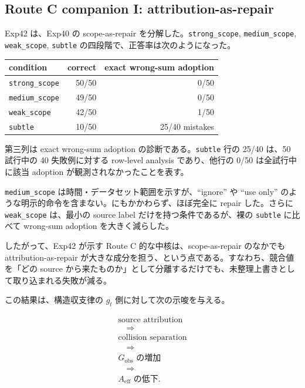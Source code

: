 \documentclass[12pt,a4paper]{article}
\begin{document}
\subsection{Route C companion I: attribution-as-repair}\label{route-c-companion-i-attribution-as-repair}

Exp42 は、Exp40 の scope-as-repair を分解した。\texttt{strong\_scope}, \texttt{medium\_scope}, \texttt{weak\_scope}, \texttt{subtle} の四段階で、正答率は次のようになった。

{\def\LTcaptype{table} %
\begin{longtable}[]{@{}lrr@{}}
\toprule\noalign{}
condition & correct & exact wrong-sum adoption \\
\midrule\noalign{}
\endhead
\bottomrule\noalign{}
\endlastfoot
\texttt{strong\_scope} & 50/50 & 0/50 \\
\texttt{medium\_scope} & 49/50 & 0/50 \\
\texttt{weak\_scope} & 42/50 & 1/50 \\
\texttt{subtle} & 10/50 & 25/40 mistakes \\
\end{longtable}
}

第三列は exact wrong-sum adoption の診断である。\texttt{subtle} 行の 25/40 は、50 試行中の 40 失敗例に対する row-level analysis であり、他行の 0/50 は全試行中に該当 adoption が観測されなかったことを表す。

\texttt{medium\_scope} は時間・データセット範囲を示すが、``ignore'' や ``use only'' のような明示的命令を含まない。にもかかわらず、ほぼ完全に repair した。さらに \texttt{weak\_scope} は、最小の source label だけを持つ条件であるが、裸の \texttt{subtle} に比べて wrong-sum adoption を大きく減らした。

したがって、Exp42 が示す Route C 的な中核は、scope-as-repair のなかでも attribution-as-repair が大きな成分を担う、という点である。すなわち、競合値を「どの source から来たものか」として分離するだけでも、未整理上書きとして取り込まれる失敗が減る。

この結果は、構造収支律の \(g_{t}\) 側に対して次の示唆を与える。

\[
\begin{aligned}
\text{source attribution} \\
\quad\Rightarrow\quad \\
\text{collision separation} \\
\quad\Rightarrow\quad \\
G_{\mathrm{obs}}\text{ の増加} \\
\quad\Rightarrow\quad \\
A_{\mathrm{eff}}\text{ の低下}.
\end{aligned}
\]
\end{document}
